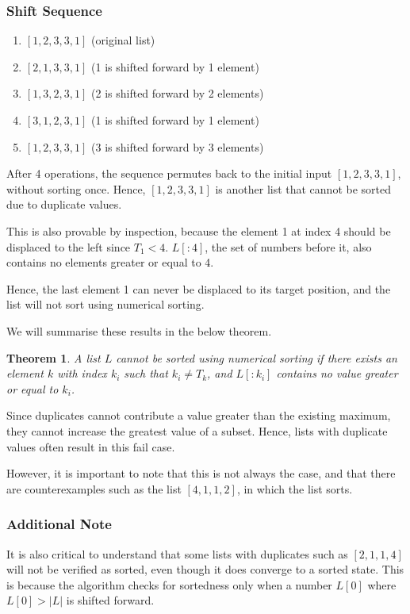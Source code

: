 \documentclass[12pt]{article}
\newtheorem{theorem}{Theorem}[section]
\begin{document}
\subsubsection{Shift Sequence}
\begin{enumerate}[start=0]
    \item $[1, 2, 3, 3, 1]$ (original list)
    \item $[2, 1, 3, 3, 1]$ (1 is shifted forward by 1 element)
    \item $[1, 3, 2, 3, 1]$ (2 is shifted forward by 2 elements)
    \item $[3, 1, 2, 3, 1]$ (1 is shifted forward by 1 element)
    \item $[1, 2, 3, 3, 1]$ (3 is shifted forward by 3 elements)
\end{enumerate}

After 4 operations, the sequence permutes back to the initial input $[1, 2, 3, 3, 1]$, without sorting once. Hence, $[1, 2, 3, 3, 1]$ is another list that cannot be sorted due to duplicate values.

This is also provable by inspection, because the element 1 at index 4 should be displaced to the left since $T_1<4$. $L[:4]$, the set of numbers before it, also contains no elements greater or equal to 4.

Hence, the last element 1 can never be displaced to its target position, and the list will not sort using numerical sorting.

We will summarise these results in the below theorem.

\begin{theorem}
 A list $L$ cannot be sorted using numerical sorting if there exists an element $k$ with index $k_i$ such that $k_i \neq T_k$, and $L[:k_i]$ contains no value greater or equal to $k_i$.
\end{theorem}

Since duplicates cannot contribute a value greater than the existing maximum, they cannot increase the greatest value of a subset. Hence, lists with duplicate values often result in this fail case.

However, it is important to note that this is not always the case, and that there are counterexamples such as the list $[4,1,1,2]$, in which the list sorts.

\subsubsection{Additional Note}
It is also critical to understand that some lists with duplicates such as $[2,1,1,4]$ will not be verified as sorted, even though it does converge to a sorted state. This is because the algorithm checks for sortedness only when a number $L[0]$ where $L[0]>|L|$ is shifted forward.
\end{document}

